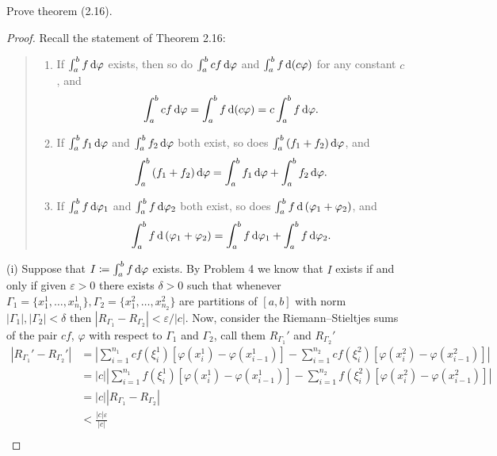 \begin{problem}
  Prove theorem (2.16).
\end{problem}
\begin{proof}
  Recall the statement of Theorem 2.16:
  \begin{quote}
    \begin{enumerate}[label=(\roman*),noitemsep]
    \item If $\int_a^b f\mathop{}\!\mathrm{d}\varphi$ exists, then so do
      $\int_a^bcf\mathop{}\!\mathrm{d}\varphi$ and $\int_a^b f\mathop{}\!\mathrm{d}(c\varphi)$ for any
      constant $c$, and
      \[
        \int_a^bcf\mathop{}\!\mathrm{d}\varphi=\int_a^bf\mathop{}\!\mathrm{d}(c\varphi)=c\int_a^bf\mathop{}\!\mathrm{d}\varphi.
      \]
    \item If $\int_a^b f_1\mathop{}\!\mathrm{d}\varphi$ and $\int_a^bf_2\mathop{}\!\mathrm{d}\varphi$ both
      exist, so does $\int_a^b\left(f_1+f_2\right)\mathop{}\!\mathrm{d}\varphi$, and
      \[
        \int_a^b\left(f_1+f_2\right)\mathop{}\!\mathrm{d}\varphi=\int_a^bf_1\mathop{}\!\mathrm{d}\varphi+\int_a^bf_2\mathop{}\!\mathrm{d}\varphi.
      \]
    \item If $\int_a^bf\mathop{}\!\mathrm{d}\varphi_1$ and $\int_a^bf\mathop{}\!\mathrm{d}\varphi_2$ both
      exist, so does $\int_a^bf\mathop{}\!\mathrm{d}\left(\varphi_1+\varphi_2\right)$, and
      \[
        \int_a^bf\mathop{}\!\mathrm{d}\left(\varphi_1+\varphi_2\right)=\int_a^bf\mathop{}\!\mathrm{d}\varphi_1+\int_a^bf\mathop{}\!\mathrm{d}\varphi_2.
      \]
    \end{enumerate}
  \end{quote}
  \noindent%
  (i) Suppose that $I\coloneq\int_a^bf\mathop{}\!\mathrm{d}\varphi$ exists. By Problem 4 we
  know that $I$ exists if and only if given $\varepsilon>0$ there exists
  $\delta>0$ such that whenever
  $\Gamma_1=\{x_1^1,\ldots,x_{n_1}^1\},\Gamma_2=\{x_1^2,\ldots,x_{n_2}^2\}$
  are partitions of $[a,b]$ with norm $|\Gamma_1|,|\Gamma_2|<\delta$ then
  $|R_{\Gamma_1}-R_{\Gamma_2}|<\varepsilon/|c|$. Now, consider the
  Riemann--Stieltjes sums of the pair $cf$, $\varphi$ with respect to
  $\Gamma_1$ and $\Gamma_2$, call them $R_{\Gamma_1}'$ and $R_{\Gamma_2}'$
  \begin{align*}
    |R_{\Gamma_1}'-R_{\Gamma_2}'|
    &=\left|\sum_{i=1}^{n_1}cf(\xi_i^1)\left[\varphi(x_i^1)-\varphi(x_{i-1}^1)\right]
      -\sum_{i=1}^{n_2}cf(\xi_i^2)\left[\varphi(x_i^2)-\varphi(x_{i-1}^2)\right]\right|\\
    &=|c|\left|\sum_{i=1}^{n_1}f(\xi_i^1)\left[\varphi(x_i^1)-\varphi(x_{i-1}^1)\right]
      -\sum_{i=1}^{n_2}f(\xi_i^2)\left[\varphi(x_i^2)-\varphi(x_{i-1}^2)\right]\right|\\
    &=|c||R_{\Gamma_1}-R_{\Gamma_2}|\\
    &<\frac{|c|\varepsilon}{|c|}\\

\end{align*}
\end{proof}
